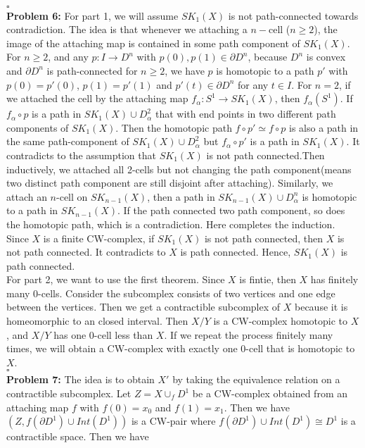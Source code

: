 \documentclass[12pt]{amsart}
\begin{document}
\\\phantom{qed}\hfill$\square$\\
\textbf{Problem 6:} For part 1, we will assume $SK_1(X)$ is not path-connected towards contradiction. The idea is that whenever we attaching a $n-$cell ($n\geq 2$), the image of the attaching map is contained in some path component of $SK_1(X)$.\\
For $n\geq 2$, and any $p:I\to D^n$ with $p(0),p(1)\in \partial D^n$, because $D^n$ is convex and $\partial D^n$ is path-connected for $n\geq 2$, we have $p$ is homotopic to a path $p'$ with $p(0)=p'(0)$, $p(1)=p'(1)$ and $p'(t)\in \partial D^n$ for any $t\in I$. For $n=2$, if we attached the cell by the attaching map $f_\alpha:S^1\to SK_1(X)$, then $f_\alpha(S^1)$. If $f_\alpha \circ p$ is a path in $SK_1(X)\cup D^2_\alpha$ that with end points in two different path components of $SK_1(X)$.  Then the homotopic path $f\circ p'\simeq f\circ p$ is also a path in the same path-component of $SK_1(X)\cup D^2_\alpha$ but $f_\alpha \circ p'$ is a path in $SK_1(X)$. It contradicts to the assumption that $SK_1(X)$ is not path connected.Then inductively, we attached all 2-cells but not changing the path component(means two distinct path component are still disjoint after attaching). Similarly, we attach an $n$-cell on $SK_{n-1}(X)$, then a path in $SK_{n-1}(X)\cup D^n_\alpha$ is homotopic to a path in $SK_{n-1}(X)$. If the path connected two path component, so does the homotopic path, which is a contradiction. Here completes the induction.\\
Since $X$ is a finite CW-complex, if $SK_1(X)$ is not path connected, then $X$ is not path connected. It contradicts to $X$ is path connected. Hence, $SK_1(X)$ is path connected.\\
For part 2, we want to use the first theorem. Since $X$ is fintie, then $X$ has finitely many 0-cells. Consider the subcomplex consists of two vertices and one edge between the vertices. Then we get a contractible subcomplex of $X$ because it is homeomorphic to an closed interval. Then $X/Y$ is a CW-complex homotopic to $X$, and $X/Y$ has one 0-cell less than $X$. If we repeat the process finitely many times, we will obtain a CW-complex with exactly one 0-cell that is homotopic to $X$.
\\\phantom{qed}\hfill$\square$\\
\textbf{Problem 7:} The idea is to obtain $X'$ by taking the equivalence relation on a contractible subcomplex. Let $Z=X\cup_f D^1$ be a CW-complex obtained from an attaching map $f$ with $f(0)=x_0$ and $f(1)=x_1$. Then we have $(Z,f(\partial D^1)\cup Int(D^1))$ is a CW-pair where $f(\partial D^1)\cup Int(D^1)\cong D^1$ is a contractible space. Then we have
\end{document}
